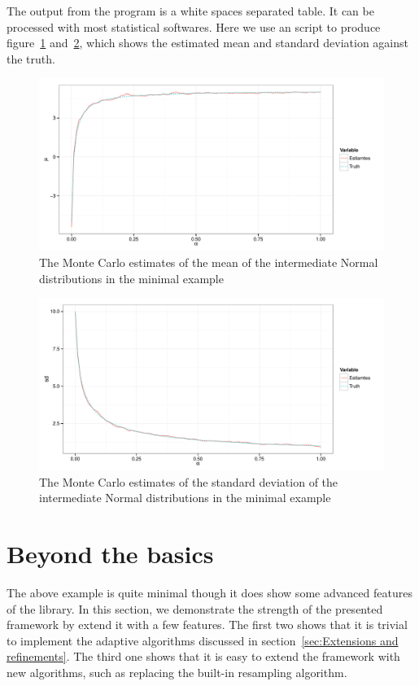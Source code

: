 The output from the program is a white spaces separated table. It can be
processed with most statistical softwares. Here we use an \rlang script to
produce figure~\ref{fig:mini mean} and~\ref{fig:mini var}, which shows the
estimated mean and standard deviation against the truth.

\begin{figure}
  \includegraphics[width=\linewidth]{fig/mini_mu}
  \caption{The Monte Carlo estimates of the mean of the intermediate Normal
    distributions in the minimal example}
  \label{fig:mini mean}
\end{figure}

\begin{figure}
  \includegraphics[width=\linewidth]{fig/mini_sd}
  \caption{The Monte Carlo estimates of the standard deviation of the
    intermediate Normal distributions in the minimal example}
  \label{fig:mini var}
\end{figure}

\section{Beyond the basics}
\label{sec:Beyond the basics}

The above example is quite minimal though it does show some advanced features
of the \vsmc library. In this section, we demonstrate the strength of the
presented framework by extend it with a few features. The first two shows that
it is trivial to implement the adaptive algorithms discussed in
section~\ref{sec:Extensions and refinements}. The third one shows that it is
easy to extend the framework with new algorithms, such as replacing the
built-in resampling algorithm.

